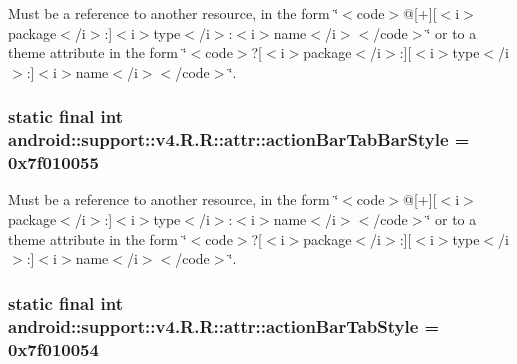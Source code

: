 Must be a reference to another resource, in the form \char`\"{}$<$code$>$@\mbox{[}+\mbox{]}\mbox{[}$<$i$>$package$<$/i$>$:\mbox{]}$<$i$>$type$<$/i$>$:$<$i$>$name$<$/i$>$$<$/code$>$\char`\"{} or to a theme attribute in the form \char`\"{}$<$code$>$?\mbox{[}$<$i$>$package$<$/i$>$:\mbox{]}\mbox{[}$<$i$>$type$<$/i$>$:\mbox{]}$<$i$>$name$<$/i$>$$<$/code$>$\char`\"{}. \hypertarget{classandroid_1_1support_1_1v4_1_1_r_1_1attr_9dffa8628ed0688f9760abfcc77549c2}{
\subsubsection[{actionBarTabBarStyle}]{\setlength{\rightskip}{0pt plus 5cm}static final int android::support::v4.R.R::attr::actionBarTabBarStyle = 0x7f010055}}
\label{classandroid_1_1support_1_1v4_1_1_r_1_1attr_9dffa8628ed0688f9760abfcc77549c2}


Must be a reference to another resource, in the form \char`\"{}$<$code$>$@\mbox{[}+\mbox{]}\mbox{[}$<$i$>$package$<$/i$>$:\mbox{]}$<$i$>$type$<$/i$>$:$<$i$>$name$<$/i$>$$<$/code$>$\char`\"{} or to a theme attribute in the form \char`\"{}$<$code$>$?\mbox{[}$<$i$>$package$<$/i$>$:\mbox{]}\mbox{[}$<$i$>$type$<$/i$>$:\mbox{]}$<$i$>$name$<$/i$>$$<$/code$>$\char`\"{}. \hypertarget{classandroid_1_1support_1_1v4_1_1_r_1_1attr_313897c0fbe257860ddbda81f27f15d8}{
\subsubsection[{actionBarTabStyle}]{\setlength{\rightskip}{0pt plus 5cm}static final int android::support::v4.R.R::attr::actionBarTabStyle = 0x7f010054}}
\label{classandroid_1_1support_1_1v4_1_1_r_1_1attr_313897c0fbe257860ddbda81f27f15d8}


